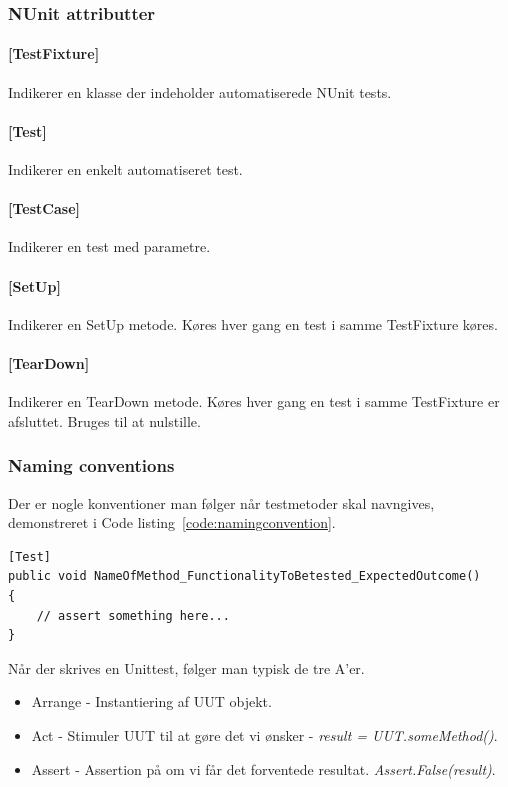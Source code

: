 \subsubsection{NUnit attributter}

\paragraph{[TestFixture]} Indikerer en klasse der indeholder automatiserede NUnit tests. 
\paragraph{[Test]} Indikerer en enkelt automatiseret test.
\paragraph{[TestCase]} Indikerer en test med parametre.
\paragraph{[SetUp]} Indikerer en SetUp metode. Køres hver gang en test i samme TestFixture køres.
\paragraph{[TearDown]} Indikerer en TearDown metode. Køres hver gang en test i samme TestFixture er afsluttet. Bruges til at nulstille.

\subsubsection{Naming conventions}
Der er nogle konventioner man følger når testmetoder skal navngives, demonstreret i Code listing~\ref{code:namingconvention}.

\begin{lstlisting}[caption=Eksempel på navngivnings konvention for test.,label=code:namingconvention]
[Test]
public void NameOfMethod_FunctionalityToBetested_ExpectedOutcome()
{
	// assert something here...
}
\end{lstlisting}

Når der skrives en Unittest, følger man typisk de tre A'er.

\begin{itemize}
	\item Arrange - Instantiering af UUT objekt.
	\item Act - Stimuler UUT til at gøre det vi ønsker - \textit{result = UUT.someMethod()}.
	\item Assert - Assertion på om vi får det forventede resultat. \textit{Assert.False(result)}.
\end{itemize}

